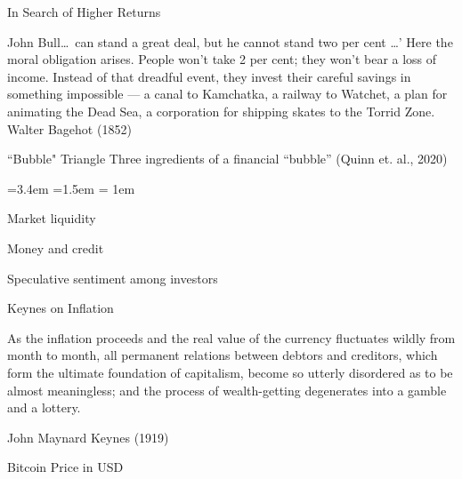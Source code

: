 \documentclass{beamer}
\begin{document}
\begin{frame}{In Search of Higher Returns}
\begin{epigraph}
{John Bull\ldots\ can stand a great deal, but he cannot stand two per cent \ldots’ Here the moral obligation arises. People won't take 2 per cent; they won't bear a loss of income. Instead of that dreadful event, they invest their careful savings in something impossible --- a canal to Kamchatka, a railway to Watchet, a plan for animating the Dead Sea, a corporation for shipping skates to the Torrid Zone.}	
{Walter Bagehot (1852)}
\end{epigraph}
	
\end{frame}



\begin{frame}{``Bubble" Triangle}
Three ingredients of a financial ``bubble'' (Quinn et. al., 2020)
\begin{list}{\faChevronCircleRight}{\leftmargin=3.4em =1.5em 
\itemsep = 1em}
\item Market liquidity
\item Money and credit
\item Speculative sentiment among investors	
\end{list}
\end{frame}

\begin{frame}{Keynes on Inflation}
\epigraph{As the inflation proceeds and the real value of the currency fluctuates wildly from month to month, all permanent relations between debtors and creditors, which form the ultimate foundation of capitalism, become so utterly disordered as to be almost meaningless; and the process of wealth-getting degenerates into a gamble and a lottery.}{John Maynard Keynes (1919)}
\end{frame}


\begin{frame}{Bitcoin Price in USD}

\centering
 
	
\end{frame}

%
%	
\end{document}

